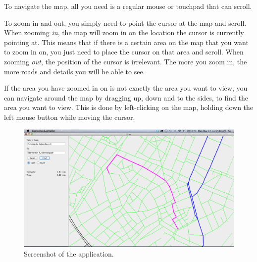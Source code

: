To navigate the map, all you need is a regular mouse or touchpad that can scroll.

To zoom in and out, you simply need to point the cursor at the map and scroll. When zooming \textsl{in}, the map will zoom in on the location the cursor is currently pointing at. This means that if there is a certain area on the map that you want to zoom in on, you just need to place the cursor on that area and scroll. When zooming \textsl{out}, the position of the cursor is irrelevant. The more you zoom in, the more roads and details you will be able to see.

If the area you have zoomed in on is not exactly the area you want to view, you can navigate around the map by dragging up, down and to the sides, to find the area you want to view. This is done by left-clicking on the map, holding down the left mouse button while moving the cursor. \\
\begin{figure}[htb]
\centering
\includegraphics[scale=0.25]{User_manual/screenshot.png}
\caption{Screenshot of the application.}
\end{figure}
